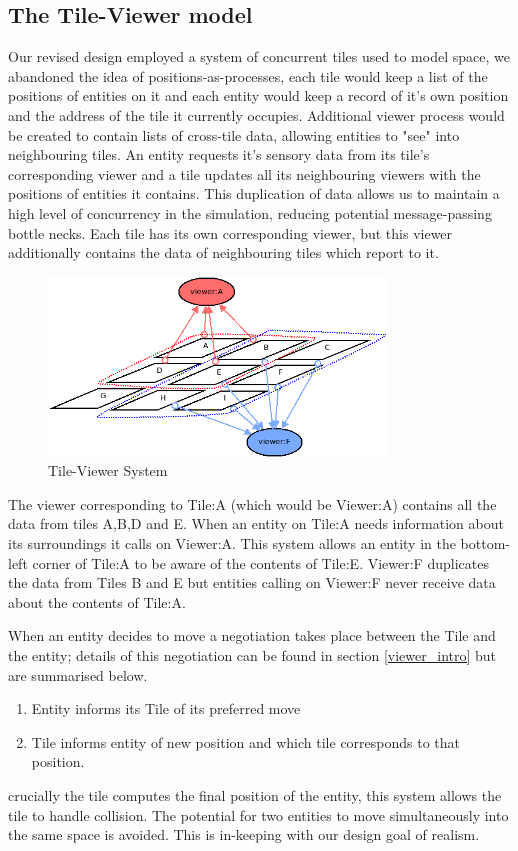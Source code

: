 \subsection{The Tile-Viewer model}
\label{tile_viewer_diagram}
Our revised design employed a system of concurrent tiles used to model space, we abandoned the idea of positions-as-processes, each tile would keep a list of the positions of entities on it and each entity would keep a record of it's own position and the address of the tile it currently occupies. Additional viewer process would be created to contain lists of cross-tile data, allowing entities to "see" into neighbouring tiles. An entity requests it's sensory data from its tile's corresponding viewer and a tile updates all its neighbouring viewers with the positions of entities it contains. This duplication of data allows us to maintain a high level of concurrency in the simulation, reducing potential message-passing bottle necks. Each tile has its own corresponding viewer, but this viewer additionally contains the data of neighbouring tiles which report to it.
\begin{figure}[h]
  \centering
  \includegraphics[width=0.8\textwidth]{img/tile_to_viewer_map.png}
\caption{Tile-Viewer System}
    \label{fig:Tile-Viewer System}
\end{figure}
The viewer corresponding to Tile:A (which would be Viewer:A) contains all the data from tiles A,B,D and E. When an entity on Tile:A needs information about its surroundings it calls on Viewer:A. This system allows an entity in the bottom-left corner of Tile:A to be aware of the contents of Tile:E. Viewer:F duplicates the data from Tiles B and E but entities calling on Viewer:F never receive data about the contents of Tile:A.

When an entity decides to move a negotiation takes place between the Tile and the entity; details of this negotiation can be found in section \ref{viewer_intro} but are summarised below.
\begin{enumerate}
\item{Entity informs its Tile of its preferred move}
\item{Tile informs entity of new position and which tile corresponds to that position.}
\end{enumerate}
crucially the tile computes the final position of the entity, this system allows the tile to handle collision. The potential for two entities to move simultaneously into the same space is avoided. This is in-keeping with our design goal of realism.

